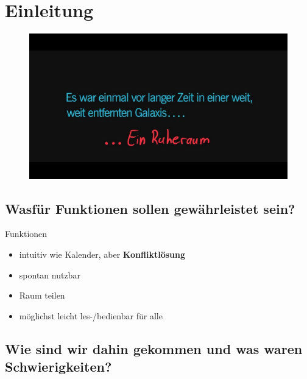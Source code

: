 \section{Einleitung}

\begin{frame}[plain]
    \thispagestyle{plain}
    \begin{figure}
        \centering
        \includegraphics[width=1\linewidth]{pictures/Galaxie}
        \label{fig:galaxie_weit_entfernt}
    \end{figure}
\end{frame}

\subsection[nötige Funktionen]{Wasfür Funktionen sollen gewährleistet sein?}

\begin{frame}{Funktionen}
    \begin{itemize}
        \item intuitiv wie Kalender, aber \textrightarrow \space \textbf{Konfliktlösung} %
        \item spontan nutzbar %
        \item Raum teilen %
        \item  möglichst leicht les-/bedienbar für alle %
    \end{itemize}
\end{frame}

\subsection[Werdegang und Schwierigkeiten]{Wie sind wir dahin gekommen und was waren Schwierigkeiten?}

